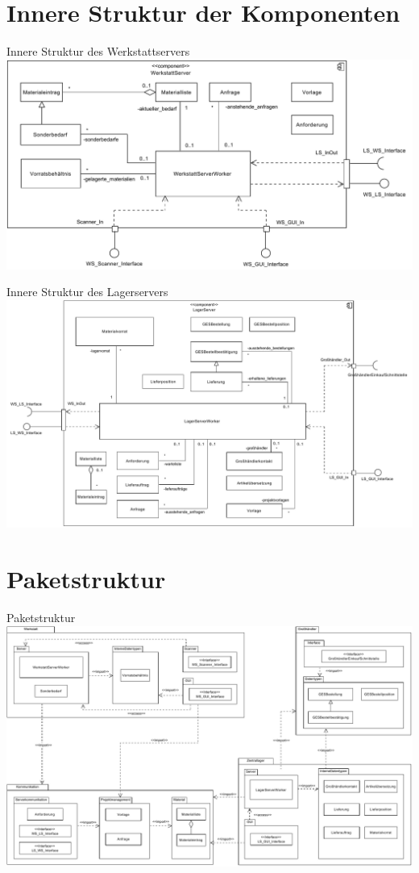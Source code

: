 \documentclass{beamer}
\begin{document}
	\section{ Innere Struktur der Komponenten}
	\begin{frame}{Innere Struktur des Werkstattservers}
		\includegraphics[width=\textwidth]{PDF/WS_Innere_Struktur.pdf}
	\end{frame}
	\begin{frame}{Innere Struktur des Lagerservers}
		\includegraphics[width=\textwidth]{PDF/LS_Innere_Struktur.pdf}
	\end{frame}
	\section{Paketstruktur}
	\begin{frame}{Paketstruktur}
		\includegraphics[height=0.75 \textheight]{PDF/Paket_Struktur.pdf}
	\end{frame}
\end{document}
